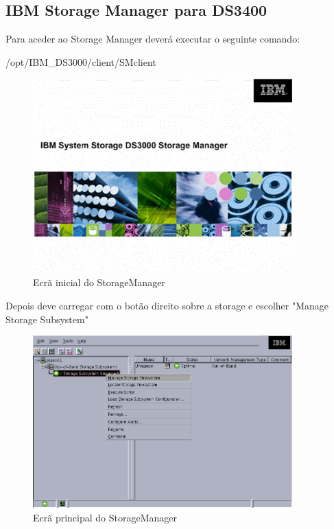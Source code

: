 \subsection{IBM Storage Manager para DS3400}

Para aceder ao Storage Manager deverá executar o seguinte comando:

/opt/IBM\_DS3000/client/SMclient


\begin{figure}[H]
    \begin{center}
        \includegraphics[width=10cm]{include/img/ds3400_1}
    \end{center}
    \caption{Ecrã inicial do StorageManager}
    \label{fig:ds3400-1}
\end{figure}

Depois deve carregar com o botão direito sobre a storage e escolher "Manage Storage Subsystem"

\begin{figure}[H]
    \begin{center}
        \includegraphics[width=10cm]{include/img/ds3400_2}
    \end{center}
    \caption{Ecrã principal do StorageManager}
    \label{fig:ds3400-2}
\end{figure}

